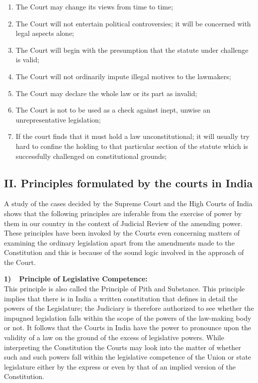 \begin{multicols}{2}
\begin{enumerate}
\item The Court may change its views from time to time;

\item The Court will not entertain political controversies; it will be concerned with legal
aspects alone;

\item  The Court will begin with the presumption that the statute under challenge is valid;

\item The Court will not ordinarily impute illegal motives to the lawmakers;

\item The Court may declare the whole law or its part as invalid;

\item The Court is not to be used as a check against inept, unwise an unrepresentative
legislation;

\item If the court finds that it must hold a law unconstitutional; it will usually try hard
to confine the holding to that particular section of the statute which is successfully
challenged on constitutional grounds;
\end{enumerate}


\subsection*{II. Principles formulated by the courts in India}

\noi
A study of the cases decided by the Supreme Court and the High Courts of India shows
that the following principles are inferable from the exercise of power by them in our
country in the context of Judicial Review of the amending power. These principles have
been invoked by the Courts even concerning matters of examining the ordinary
legislation apart from the amendments made to the Constitution and this is because of
the sound logic involved in the approach of the Court.

\noi
{\bf 1)~~Principle of Legislative Competence: }\\[.2cm] This principle is also called the Principle of Pith and Substance. This principle
implies that there is in India a written constitution that defines in detail the powers of
the Legislature; the Judiciary is therefore authorized to see whether the impugned
legislation falls within the scope of the powers of the law-making body or not. It follows
that the Courts in India have the power to pronounce upon the validity of a law on the
ground of the excess of legislative powers. While interpreting the Constitution the
Courts may look into the matter of whether such and such powers fall within the
legislative competence of the Union or state legislature either by the express or even by
that of an implied version of the Constitution. 


\end{multicols}
